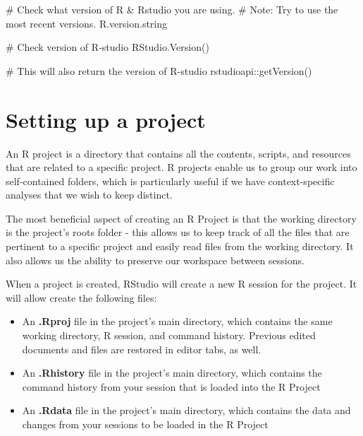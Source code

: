 \documentclass[
  letterpaper,
  DIV=11,
  numbers=noendperiod]{scrreprt}
\newenvironment{Shaded}{\begin{snugshade}}{\end{snugshade}}
\newcommand{\CommentTok}[1]{\textcolor[rgb]{0.37,0.37,0.37}{#1}}
\newcommand{\FunctionTok}[1]{\textcolor[rgb]{0.28,0.35,0.67}{#1}}
\newcommand{\NormalTok}[1]{\textcolor[rgb]{0.00,0.23,0.31}{#1}}
\newcommand{\SpecialCharTok}[1]{\textcolor[rgb]{0.37,0.37,0.37}{#1}}
\providecommand{\tightlist}{%
  \setlength{\itemsep}{0pt}\setlength{\parskip}{0pt}}\usepackage{longtable,booktabs,array}
\begin{document}
\begin{Shaded}
\begin{Highlighting}[]
\CommentTok{\# Check what version of R \& Rstudio you are using. }
\CommentTok{\# Note: Try to use the most recent versions.}
\NormalTok{R.version.string}
\end{Highlighting}
\end{Shaded}

\begin{Shaded}
\begin{Highlighting}[]
\CommentTok{\# Check version of R{-}studio}
\FunctionTok{RStudio.Version}\NormalTok{()}

\CommentTok{\# This will also return the version of R{-}studio}
\NormalTok{rstudioapi}\SpecialCharTok{::}\FunctionTok{getVersion}\NormalTok{()}
\end{Highlighting}
\end{Shaded}

\hypertarget{setting-up-a-project}{%
\chapter{Setting up a project}\label{setting-up-a-project}}

An R project is a directory that contains all the contents, scripts, and
resources that are related to a specific project. R projects enable us
to group our work into self-contained folders, which is particularly
useful if we have context-specific analyses that we wish to keep
distinct.

The most beneficial aspect of creating an R Project is that the working
directory is the project's roots folder - this allows us to keep track
of all the files that are pertinent to a specific project and easily
read files from the working directory. It also allows us the ability to
preserve our workspace between sessions.

When a project is created, RStudio will create a new R session for the
project. It will allow create the following files:

\begin{itemize}
\tightlist
\item
  An \textbf{.Rproj} file in the project's main directory, which
  contains the same working directory, R session, and command history.
  Previous edited documents and files are restored in editor tabs, as
  well.
\item
  An \textbf{.Rhistory} file in the project's main directory, which
  contains the command history from your session that is loaded into the
  R Project
\item
  An \textbf{.Rdata} file in the project's main directory, which
  contains the data and changes from your sessions to be loaded in the R
  Project
\end{itemize}
\end{document}
